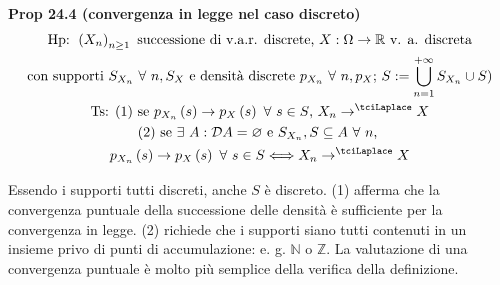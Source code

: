 \documentclass{article}
\begin{document}
\textbf{Prop 24.4 (convergenza in legge nel caso discreto)}%
\begin{gather*}
\text{Hp}\text{: }\left( X_{n}\right) _{n\geq 1}\text{ successione di v.a.r.
discrete, }X:\Omega \rightarrow 
\mathbb{R}
\text{ v. a. discreta} \\
\text{con supporti }S_{X_{n}}\text{ }\forall \text{ }n,S_{X}\text{ e densit%
\`{a} discrete }p_{X_{n}}\text{ }\forall \text{ }n,p_{X}\text{; }%
S:=\bigcup_{n=1}^{+\infty }S_{X_{n}}\cup S\text{)} \\
\text{Ts}\text{: }\text{(1) se }p_{X_{n}}\left( s\right) \rightarrow
p_{X}\left( s\right) \text{ }\forall \text{ }s\in S\text{, }X_{n}\rightarrow
^{\tciLaplace }X \\
\text{(2) se }\exists \text{ }A:\mathcal{D}A=\varnothing \text{ e }%
S_{X_{n}},S\subseteq A\text{ }\forall \text{ }n\text{, } \\
p_{X_{n}}\left( s\right) \rightarrow p_{X}\left( s\right) \text{ }\forall 
\text{ }s\in S\Longleftrightarrow X_{n}\rightarrow ^{\tciLaplace }X
\end{gather*}

Essendo i supporti tutti discreti, anche $S$ \`{e} discreto. (1) afferma che
la convergenza puntuale della successione delle densit\`{a} \`{e}
sufficiente per la convergenza in legge. (2) richiede che i supporti siano
tutti contenuti in un insieme privo di punti di accumulazione: e. g. $%
\mathbb{N}
$ o $%
\mathbb{Z}
$. La valutazione di una convergenza puntuale \`{e} molto pi\`{u} semplice
della verifica della definizione.
\end{document}
